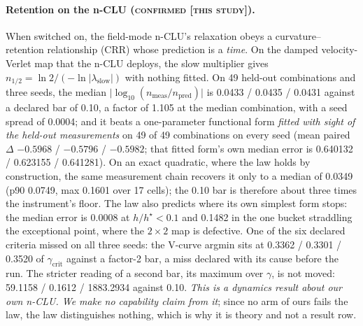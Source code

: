 \documentclass{article} %
\begin{document}
\paragraph{Retention on the n-CLU (\textsc{confirmed [this study]}).} When switched on, the field-mode
n-CLU's relaxation obeys a curvature--retention relationship (CRR) whose prediction is a
\emph{time}. On the damped velocity-Verlet map that the n-CLU deploys, the slow
multiplier gives $n_{1/2}=\ln2/(-\ln\lvert\lambda_{\text{slow}}\rvert)$ with nothing fitted. On 49
held-out combinations and three seeds, the median $\lvert\log_{10}(n_{\text{meas}}/n_{\text{pred}})\rvert$ is
0.0433 / 0.0435 / 0.0431 against a declared bar of 0.10, a factor of 1.105 at the median
combination, with a seed spread of 0.0004; and it beats a one-parameter functional form \emph{fitted with sight
of the held-out measurements} on 49 of 49 combinations on every seed (mean paired $\Delta$ $-0.5968$ /
$-0.5796$ / $-0.5982$; that fitted form's own median error is 0.640132 / 0.623155 / 0.641281).
On an exact quadratic, where the law holds by construction, the same measurement chain recovers it
only to a median of 0.0349 (p90 0.0749, max 0.1601 over 17 cells); the 0.10 bar is therefore about
three times the instrument's floor. %
The law also predicts where its own simplest form stops: the median error is 0.0008 at $h/h^\star<0.1$
and 0.1482 in the one bucket straddling the exceptional point, where the $2\times2$ map is
defective. %
One of the six declared criteria missed on all three seeds: the V-curve argmin sits at 0.3362 /
0.3301 / 0.3520 of $\gamma_{\text{crit}}$ against a factor-2 bar, a miss declared with its
cause before the run. The stricter reading of a second bar, its maximum over $\gamma$, is
not moved: 59.1158 / 0.1612 / 1883.2934 against 0.10.
\emph{This is a dynamics result about our own n-CLU. We make no capability claim from it}; since no arm of ours fails the law, the
law distinguishes nothing, which is why it is theory and not a result row.
\end{document}
